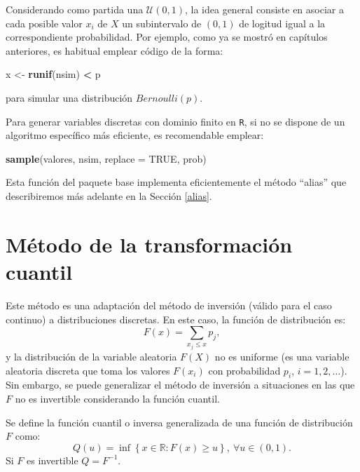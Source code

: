 \documentclass[
]{book}
\newenvironment{Shaded}{\begin{snugshade}}{\end{snugshade}}
\newcommand{\DataTypeTok}[1]{\textcolor[rgb]{0.13,0.29,0.53}{#1}}
\newcommand{\KeywordTok}[1]{\textcolor[rgb]{0.13,0.29,0.53}{\textbf{#1}}}
\newcommand{\NormalTok}[1]{#1}
\newcommand{\OperatorTok}[1]{\textcolor[rgb]{0.81,0.36,0.00}{\textbf{#1}}}
\newcommand{\OtherTok}[1]{\textcolor[rgb]{0.56,0.35,0.01}{#1}}
\newcommand{\StringTok}[1]{\textcolor[rgb]{0.31,0.60,0.02}{#1}}
\theoremstyle{break}
\theoremstyle{definition}
\theoremstyle{definition}
\theoremstyle{definition}
\theoremstyle{remark}
\begin{document}
Considerando como partida una \(\mathcal{U}\left( 0,1\right)\), la
idea general consiste en asociar a cada posible valor \(x_{i}\) de \(X\)
un subintervalo de \(\left( 0,1\right)\) de logitud igual a la correspondiente
probabilidad.
Por ejemplo, como ya se mostró en capítulos anteriores, es habitual emplear
código de la forma:

\begin{Shaded}
\begin{Highlighting}[]
\NormalTok{x <-}\StringTok{ }\KeywordTok{runif}\NormalTok{(nsim) }\OperatorTok{<}\StringTok{ }\NormalTok{p}
\end{Highlighting}
\end{Shaded}

para simular una distribución \(Bernoulli(p)\).

Para generar variables discretas con dominio finito en \texttt{R},
si no se dispone de un algoritmo específico más eficiente,
es recomendable emplear:

\begin{Shaded}
\begin{Highlighting}[]
\KeywordTok{sample}\NormalTok{(valores, nsim, }\DataTypeTok{replace =} \OtherTok{TRUE}\NormalTok{, prob)}
\end{Highlighting}
\end{Shaded}

Esta función del paquete base implementa eficientemente el método ``alias''
que describiremos más adelante en la Sección \ref{alias}.

\hypertarget{muxe9todo-de-la-transformaciuxf3n-cuantil}{%
\section{Método de la transformación cuantil}\label{muxe9todo-de-la-transformaciuxf3n-cuantil}}

Este método es una adaptación del método de inversión (válido para el
caso continuo) a distribuciones discretas. En este caso,
la función de distribución es:
\[F\left( x\right)  =\sum_{x_{j}\leq x}p_{j},\]
y la distribución de la variable aleatoria \(F\left( X\right)\) no es uniforme
(es una variable aleatoria discreta que toma los valores
\(F\left( x_{i} \right)\) con probabilidad \(p_{i}\), \(i=1,2,\ldots\)).
Sin embargo, se puede generalizar el método de inversión a situaciones
en las que \(F\) no es invertible considerando la función cuantil.

Se define la función cuantil o inversa generalizada de una función de distribución \(F\) como:
\[Q\left( u\right) =\inf \left\{ x\in \mathbb{R}:F\left( x\right) \geq
u\right\} ,\ \forall u\in \left( 0,1\right).\]
Si \(F\) es invertible \(Q=F^{-1}\).
\end{document}
